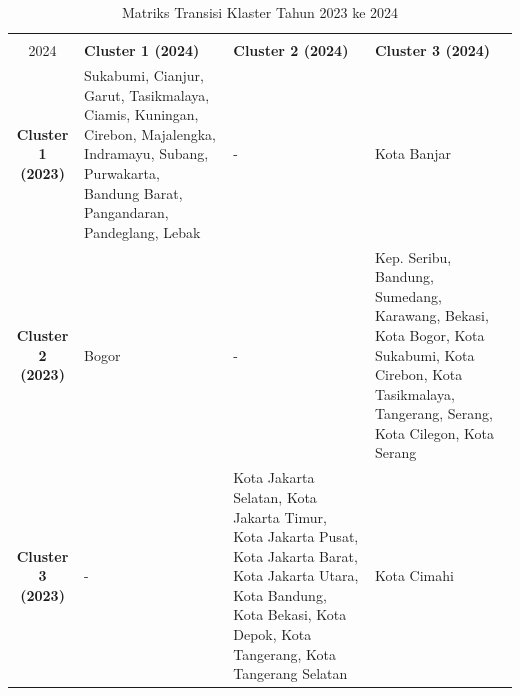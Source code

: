 \begin{table}[H]
\centering
\caption{Matriks Transisi Klaster Tahun 2023 ke 2024} \label{tab:transisi_2023_2024}
\begin{tabular}{|c|p{2cm}|p{2cm}|p{2cm}|}
\hline
\textbf{Tahun 2023 \\ 2024} & \textbf{Cluster 1 (2024)} & \textbf{Cluster 2 (2024)} & \textbf{Cluster 3 (2024)} \\ \hline
\textbf{Cluster 1 (2023)} & Sukabumi, Cianjur, Garut, Tasikmalaya, Ciamis, Kuningan, Cirebon, Majalengka, Indramayu, Subang, Purwakarta, Bandung Barat, Pangandaran, Pandeglang, Lebak & - & Kota Banjar \\ \hline
\textbf{Cluster 2 (2023)} & Bogor & - & Kep. Seribu, Bandung, Sumedang, Karawang, Bekasi, Kota Bogor, Kota Sukabumi, Kota Cirebon, Kota Tasikmalaya, Tangerang, Serang, Kota Cilegon, Kota Serang \\ \hline
\textbf{Cluster 3 (2023)} & - & Kota Jakarta Selatan, Kota Jakarta Timur, Kota Jakarta Pusat, Kota Jakarta Barat, Kota Jakarta Utara, Kota Bandung, Kota Bekasi, Kota Depok, Kota Tangerang, Kota Tangerang Selatan & Kota Cimahi \\ \hline
\end{tabular}
\end{table}